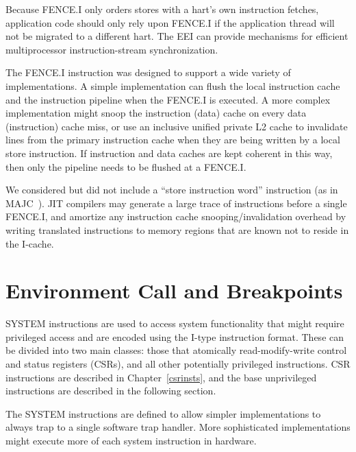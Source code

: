 \begin{commentary}
Because FENCE.I only orders stores with a hart's own instruction
fetches, application code should only rely upon FENCE.I if the
application thread will not be migrated to a different hart.  The EEI
can provide mechanisms for efficient multiprocessor instruction-stream
synchronization.
\end{commentary}

\begin{commentary}
The FENCE.I instruction was designed to support a wide variety of
implementations.  A simple implementation can flush the local
instruction cache and the instruction pipeline when the FENCE.I is
executed.  A more complex implementation might snoop the instruction
(data) cache on every data (instruction) cache miss, or use an
inclusive unified private L2 cache to invalidate lines from the
primary instruction cache when they are being written by a local store
instruction.  If instruction and data caches are kept coherent in this
way, then only the pipeline needs to be flushed at a FENCE.I.

We considered but did not include a ``store instruction word''
instruction (as in MAJC~\cite{majc}).  JIT compilers may generate a
large trace of instructions before a single FENCE.I, and amortize any
instruction cache snooping/invalidation overhead by writing translated
instructions to memory regions that are known not to reside in the
I-cache.
\end{commentary}

\section{Environment Call and Breakpoints}

SYSTEM instructions are used to access system functionality that might
require privileged access and are encoded using the I-type instruction
format.  These can be divided into two main classes: those that
atomically read-modify-write control and status registers (CSRs), and
all other potentially privileged instructions. CSR instructions are
described in Chapter~\ref{csrinsts}, and the base unprivileged instructions
are described in the following section.

\begin{commentary}
The SYSTEM instructions are defined to allow simpler implementations
to always trap to a single software trap handler.  More sophisticated
implementations might execute more of each system instruction in
hardware.
\end{commentary}


